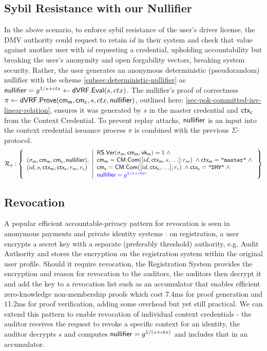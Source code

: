 \subsection*{Sybil Resistance with our Nullifier}
In the above scenario, to enforce sybil resistance of the user's driver license, the DMV authority could request to retain $id$ in their system and check that value against another user with $id$ requesting a credential, upholding accountability but breaking the user's anonymity and open forgability vectors, breaking system security. Rather, the user generates an anonymous deterministic (pseudorandom) nullifier with the scheme \ref{subsec:deterministic-nullifier} as $\mathsf{nullifier} = g^{1/s + ctx} \gets \mathsf{dVRF.Eval}(s, ctx)$. The nullifier's proof of correctness $\pi \gets \mathsf{dVRF.Prove}(\mathsf{cm_m}, \mathsf{cm_c}, s, ctx, \mathsf{nullifier})$, outlined here: \ref{sec-pok-committed-inv-linear-relation}, ensures it was generated by $s$ in the master credential and $\mathsf{ctx_c}$ from the Context Credential. To prevent replay attacks, $\mathsf{nullifier}$ is an input into the context credential issuance process $\pi$ is combined with the previous $\Sigma$-protocol. 
\[
\mathcal{R}_{\phi}: \left\{ 
\begin{array}{l}
(\sigma_{\mathsf{m}}, \mathsf{cm_m}, \mathsf{cm_c}, \mathsf{nullifier}), \\
(id, s, \mathsf{ctx_m}, \mathsf{ctx_c}, r_m, r_c) 
\end{array}
\middle| 
\begin{array}{lcl}
    \mathsf{RS.Ver}(\sigma_{\mathsf{m}}, \mathsf{cm_m}, \mathsf{vk_m}) = 1 \; \wedge \; \\
    \mathsf{cm_m} = \mathsf{CM.Com}([id, \mathsf{ctx_m}, s, \ldots]; r_m) \; \wedge \mathsf{ctx_m} = \texttt{"master"} \; \wedge \; \\
    \mathsf{cm_c} = \mathsf{CM.Com}([id, \mathsf{ctx_c}, \ldots]; r_c) \; \wedge \mathsf{ctx_c} = \texttt{"DMV"} \; \wedge \; \\
    \textcolor{blue}{\mathsf{nullifier} = g^{1/s + ctxc}}
\end{array} \right\}
\]




\subsection*{Revocation}
A popular efficient accountable-privacy pattern for revocation is seen in anonymous payments \cite{damgard_balancing_2020} and private identity systems \cite{wang2023hades}: on registration, a user encrypts a secret key with a separate (preferably threshold) authority, e.g. Audit Authority and stores the encryption on the registration system within the original user profile. Should it require revocation, the Registration System provides the encryption and reason for revocation to the auditors, the auditors then decrypt it and add the key to a revocation list such as an accumulator that enables efficient zero-knowledge non-membership proofs \cite{jaques_allosaur_2024, galbraith_dynamic_2022} which cost 7.4ms for proof generation and 11.2ms for proof verification, adding some overhead but yet still practical. We can extend this pattern to enable revocation of individual context credentials - the auditor receives the request to revoke a specific context for an identity, the auditor decrypts $s$ and computes $\mathsf{nullifier} = g^{1/(s + ctx)}$ and includes that in an accumulator.

